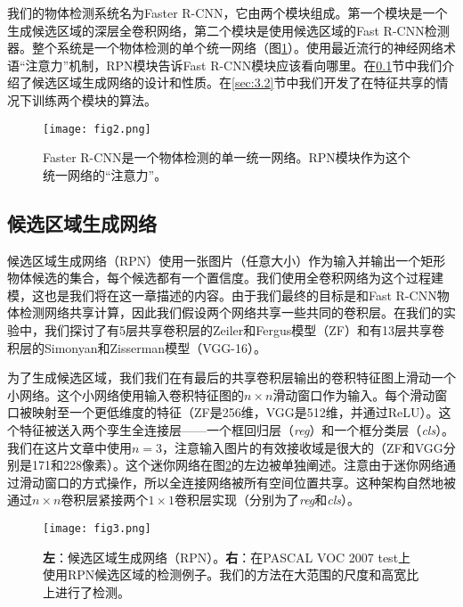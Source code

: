 \documentclass[../main.tex]{subfile}
\begin{document}
我们的物体检测系统名为Faster R-CNN，它由两个模块组成。第一个模块是一个生成候选区域的深层全卷积网络，第二个模块是使用候选区域的Fast R-CNN检测器\cite{fastrcnn}。整个系统是一个物体检测的单个统一网络（图\ref{fig:img2}）。使用最近流行的神经网络术语“注意力”机制，RPN模块告诉Fast R-CNN模块应该看向哪里。在\ref{sec:3.1}节中我们介绍了候选区域生成网络的设计和性质。在\ref{sec:3.2}节中我们开发了在特征共享的情况下训练两个模块的算法。

\begin{figure}[bh]
    \centering
    \texttt{[image: fig2.png]}
    \caption{Faster R-CNN是一个物体检测的单一统一网络。RPN模块作为这个统一网络的“注意力”。}
    \label{fig:img2}
\end{figure}

\subsection{候选区域生成网络} \label{sec:3.1}

候选区域生成网络（RPN）使用一张图片（任意大小）作为输入并输出一个矩形物体候选的集合，每个候选都有一个置信度。我们使用全卷积网络\cite{fcn}为这个过程建模，这也是我们将在这一章描述的内容。由于我们最终的目标是和Fast R-CNN物体检测网络\cite{fastrcnn}共享计算，因此我们假设两个网络共享一些共同的卷积层。在我们的实验中，我们探讨了有5层共享卷积层的Zeiler和Fergus模型\cite{zf}（ZF）和有13层共享卷积层的Simonyan和Zisserman模型\cite{vgg}（VGG-16）。

为了生成候选区域，我们我们在有最后的共享卷积层输出的卷积特征图上滑动一个小网络。这个小网络使用输入卷积特征图的$n\times n$滑动窗口作为输入。每个滑动窗口被映射至一个更低维度的特征（ZF是256维，VGG是512维，并通过ReLU\cite{relu}）。这个特征被送入两个孪生全连接层——一个框回归层（\textit{reg}）和一个框分类层（\textit{cls}）。我们在这片文章中使用$n=3$，注意输入图片的有效接收域是很大的（ZF和VGG分别是171和228像素）。这个迷你网络在图\ref{fig:img3}的左边被单独阐述。注意由于迷你网络通过滑动窗口的方式操作，所以全连接网络被所有空间位置共享。这种架构自然地被通过$n \times n$卷积层紧接两个$1\times 1$卷积层实现（分别为了\textit{reg}和\textit{cls}）。

\begin{figure}[bh]
    \centering
    \texttt{[image: fig3.png]}
    \caption{\textbf{左}：候选区域生成网络（RPN）。\textbf{右}：在PASCAL VOC 2007 test上使用RPN候选区域的检测例子。我们的方法在大范围的尺度和高宽比上进行了检测。}
    \label{fig:img3}
\end{figure}
\end{document}
